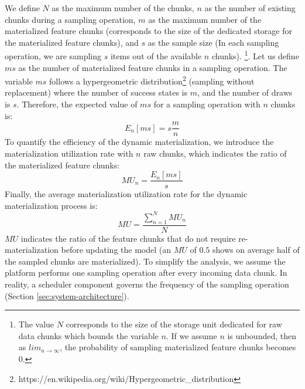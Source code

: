 We define $N$ as the maximum number of the chunks, $n$ as the number of existing chunks during a sampling operation, $m$ as the maximum number of the materialized feature chunks (corresponds to the size of the dedicated storage for the materialized feature chunks), and $s$ as the sample size (In each sampling operation, we are sampling $s$ items out of the available $n$ chunks). \footnote{The value $N$ corresponds to the size of the storage unit dedicated for raw data chunks which bounds the variable $n$. If we assume $n$ is unbounded, then as $lim_{n\to\infty}$, the probability of sampling materialized feature chunks becomes $0$.}. 
Let us define $ms$ as the number of materialized feature chunks in a sampling operation.
The variable $ms$ follows a hypergeometric distribution\footnote{https://en.wikipedia.org/wiki/Hypergeometric\_distribution} (sampling without replacement) where the number of success states is $m$, and the number of draws is $s$.
Therefore, the expected value of $ms$ for a sampling operation with $n$ chunks is:
\begin{equation*}
E_n[ms] = s\dfrac{m}{n}
\end{equation*}
To quantify the efficiency of the dynamic materialization, we introduce the materialization utilization rate with $n$ raw chunks, which indicates the ratio of the materialized feature chunks:
\begin{equation*}   
 MU_n=  \dfrac{E_n[ms]}{s}
\end{equation*}
Finally, the average materialization utilization rate for the dynamic materialization process is:
\begin{equation}  \label{formula-mu}
MU = \dfrac{\sum_{n=1}^N MU_n}{N}
\end{equation}
$MU$ indicates the ratio of the feature chunks that do not require re-materialization before updating the model (an $MU$ of $0.5$ shows on average half of the sampled chunks are materialized).
To simplify the analysis, we assume the platform performs one sampling operation after every incoming data chunk. 
In reality, a scheduler component governs the frequency of the sampling operation (Section \ref{sec:system-architecture}).

